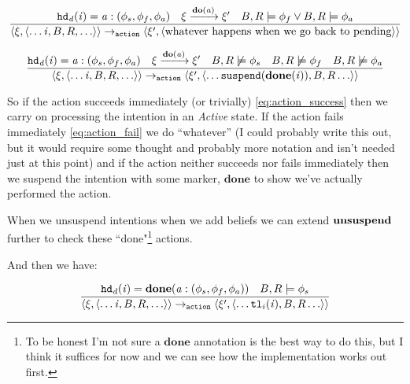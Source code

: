 \documentclass{blue-book}
\begin{document}
\begin{equation}
  \frac{
    \mathit{{\tt hd}_d}(\mathit{i}) = \mathit{a}:(\phi_s,\phi_f,\phi_a)
\quad \xi \xrightarrow{\mathrm{\mathbf{do}}(\mathit{a})} \xi'  \quad B, R \models \phi_f \lor B, R \models \phi_a
}{
\langle \xi, \langle \ldots \mathit{i}, B, R, \ldots \rangle \rangle \rightarrow_{\tt action} 
\langle \xi', \langle \text{whatever happens when we go back to pending} \rangle \rangle
}
\label{eq:action_fail}
\end{equation}

\begin{equation}
  \frac{
    \mathit{{\tt hd}_d}(\mathit{i}) = \mathit{a}:(\phi_s,\phi_f,\phi_a)
\quad \xi \xrightarrow{\mathrm{\mathbf{do}}(\mathit{a})} \xi'  \quad B, R \not \models \phi_s \quad B, R \not \models \phi_f \quad B, R \not \models \phi_a
}{
\langle \xi, \langle \ldots \mathit{i}, B, R, \ldots \rangle \rangle \rightarrow_{\tt action} 
\langle \xi', \langle \ldots {\tt suspend}(\mathbf{done}(\mathit{i})), B, R \ldots \rangle \rangle
}
\label{eq:action_new}
\end{equation}

So if the action succeeds immediately (or trivially) \eqref{eq:action_success} then we carry on processing the intention in an \emph{Active} state.  If the action fails immediately \eqref{eq:action_fail} we do ``whatever'' (I could probably write this out, but it would require some thought and probably more notation and isn't needed just at this point) and if the action neither succeeds nor fails immediately then we suspend the intention with some marker, $\mathbf{done}$ to show we've actually performed the action.

When we unsuspend intentions when we add beliefs we can extend $\bf unsuspend$ further to check these ``done"\footnote{To be honest I'm not sure a $\mathbf{done}$ annotation is the best way to do this, but I think it suffices for now and we can see how the implementation works out first.} actions.

And then we have:

\begin{equation}
  \frac{
    \mathit{{\tt hd}_d}(\mathit{i}) = \mathbf{done}(\mathit{a}:(\phi_s,\phi_f,\phi_a))  \quad B, R \models \phi_s
}{
\langle \xi, \langle \ldots \mathit{i}, B, R, \ldots \rangle \rangle \rightarrow_{\tt action} 
\langle \xi', \langle \ldots {\tt tl}_i(\mathit{i}), B, R \ldots \rangle \rangle
}
\label{eq:done_action_success}
\end{equation}
\end{document}
